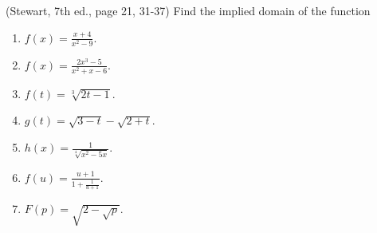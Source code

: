(Stewart, 7th ed., page 21, 31-37) Find the implied domain of the function
\begin{multicols}{2}
\begin{enumerate}
\item $f(x)=\frac{x+4}{x^2-9}$. 
\item $f(x)=\frac{2x^3-5}{x^2+x-6}$.
\item $f(t)=\sqrt[3]{2t-1}$.
\item $g(t)=\sqrt{3-t}-\sqrt{2+t}$.
\item $h(x)=\frac{1}{\sqrt[4]{x^2-5x}}$.
\item $f(u)=\frac{u+1}{1+\frac{1}{u+1}}$.
\item $F(p)=\sqrt{2-{\sqrt{p}}}$.
\end{enumerate}
\end{multicols}